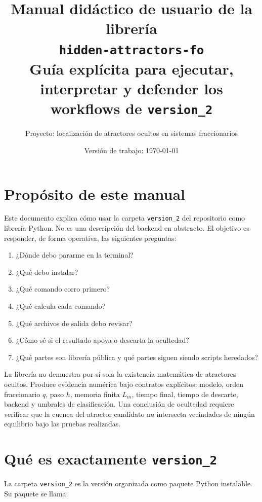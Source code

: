 \documentclass[11pt,letterpaper]{article}
\title{\textbf{Manual didáctico de usuario de la librería}\\[2mm]
\texttt{hidden-attractors-fo}\\[1mm]
\large Guía explícita para ejecutar, interpretar y defender los workflows de \texttt{version\_2}}
\author{Proyecto: localización de atractores ocultos en sistemas fraccionarios}
\date{Versión de trabajo: \today}
\begin{document}
\maketitle
\tableofcontents
\newpage

\section{Propósito de este manual}

Este documento explica cómo usar la carpeta \texttt{version\_2} del repositorio como librería Python. No es una descripción del backend en abstracto. El objetivo es responder, de forma operativa, las siguientes preguntas:

\begin{enumerate}[label=\arabic*)]
  \item ¿Dónde debo pararme en la terminal?
  \item ¿Qué debo instalar?
  \item ¿Qué comando corro primero?
  \item ¿Qué calcula cada comando?
  \item ¿Qué archivos de salida debo revisar?
  \item ¿Cómo sé si el resultado apoya o descarta la ocultedad?
  \item ¿Qué partes son librería pública y qué partes siguen siendo scripts heredados?
\end{enumerate}

\begin{advertencia}
La librería no demuestra por sí sola la existencia matemática de atractores ocultos. Produce evidencia numérica bajo contratos explícitos: modelo, orden fraccionario $q$, paso $h$, memoria finita $L_m$, tiempo final, tiempo de descarte, backend y umbrales de clasificación. Una conclusión de ocultedad requiere verificar que la cuenca del atractor candidato no intersecta vecindades de ningún equilibrio bajo las pruebas realizadas.
\end{advertencia}

\section{Qué es exactamente \texttt{version\_2}}

La carpeta \texttt{version\_2} es la versión organizada como paquete Python instalable. Su paquete se llama:
\end{document}

